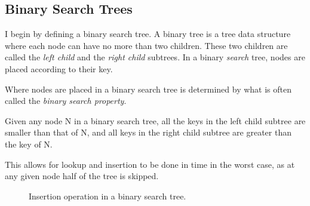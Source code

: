 
\subsection{Binary Search Trees} 
\label{sec:bst}
I begin by defining a binary search tree. A binary tree is a tree data structure where each node can have no more than two children. These two children are 
called the \textit{left child} and the \textit{right child} subtrees. In a binary \textit{search} tree, nodes are placed according to their key. 

Where nodes are placed in a binary search tree is determined by what is often called the \textit{binary search property}.

\begin{definition}
  \label{def:bst_property}
  Given any node N in a binary search tree, all the keys in the left child subtree are smaller than that of N, and all keys in the right child subtree are greater than the 
  key of N.
\end{definition}

This allows for lookup and insertion to be done in  time in the worst case, as at any given node half of the tree is skipped.

\begin{figure}[!h]
  \centering
  \begin{subfigure}{.3\textwidth}
    \centering
    \caption{}
    \label{fig:insert_1}
  \end{subfigure}%
  \begin{subfigure}{.3\textwidth}
    \centering
    \caption{}
    \label{fig:insert_2}
  \end{subfigure}%
  \begin{subfigure}{.3\textwidth}
    \centering
    \caption{}
    \label{fig:insert_3}
  \end{subfigure}
  \caption{Insertion operation in a binary search tree.}
  \label{fig:insert_demo}
\end{figure}

